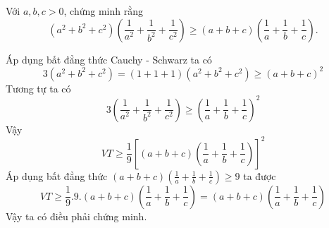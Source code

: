 \begin{problem}
	Với $a, b, c > 0$, chứng minh rằng
	$$
		(a^2 + b^2 + c^2)\left(\frac{1}{a^2} + \frac{1}{b^2} + \frac{1}{c^2}\right) \ge 
		(a + b + c)\left(\frac{1}{a} + \frac{1}{b} + \frac{1}{c}\right).
	$$
	\solution

	Áp dụng bất đẳng thức Cauchy - Schwarz ta có
	$$
		3(a^2 + b^2 + c^2) = (1 + 1 + 1)(a^2 + b^2 + c^2) \ge (a + b + c)^2
	$$
	Tương tự ta có 
	$$
		3\left(\frac{1}{a^2} + \frac{1}{b^2} + \frac{1}{c^2}\right) \ge 
		\left(\frac{1}{a} + \frac{1}{b} + \frac{1}{c}\right)^2
	$$
	Vậy
	$$
		VT \ge \frac{1}{9}\left[(a + b + c)\left(\frac{1}{a} + \frac{1}{b} + \frac{1}{c}\right)\right]^2
	$$
	Áp dụng bất đẳng thức $\displaystyle (a + b + c)\left(\frac{1}{a} + \frac{1}{b} + \frac{1}{c}\right) \ge 9$ ta được
	$$
		VT \ge \frac{1}{9}.9.(a + b + c)\left(\frac{1}{a} + \frac{1}{b} + \frac{1}{c}\right)
		= (a + b + c)\left(\frac{1}{a} + \frac{1}{b} + \frac{1}{c}\right)
	$$
	Vậy ta có điều phải chứng minh.
\end{problem}